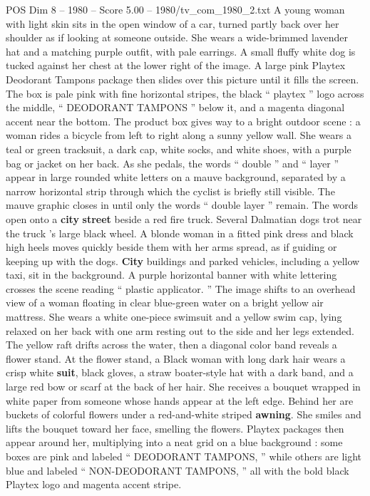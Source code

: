 \begin{textsample}{POS Dim 8 – 1980 – Score 5.00 – 1980/tv\_com\_1980\_2.txt}  \label{ex:f8_pos_050}
A young woman with light skin sits in the open window of a car, turned partly back over her shoulder as if looking at someone outside.
She wears a wide-brimmed lavender hat and a matching purple outfit, with pale earrings.
A small fluffy white dog is tucked against her chest at the lower right of the image.
A large pink Playtex Deodorant Tampons package then slides over this picture until it fills the screen.
The box is pale pink with fine horizontal stripes, the black “ playtex ” logo across the middle, “ DEODORANT TAMPONS ” below it, and a magenta diagonal accent near the bottom.
The product box gives way to a bright outdoor scene : a woman rides a bicycle from left to right along a sunny yellow wall.
She wears a teal or green tracksuit, a dark cap, white socks, and white shoes, with a purple bag or jacket on her back.
As she pedals, the words “ double ” and “ layer ” appear in large rounded white letters on a mauve background, separated by a narrow horizontal strip through which the cyclist is briefly still visible.
The mauve graphic closes in until only the words “ double layer ” remain.
The words open onto a \textbf{city} \textbf{street} beside a red fire truck.
Several Dalmatian dogs trot near the truck ’s large black wheel.
A blonde woman in a fitted pink dress and black high heels moves quickly beside them with her arms spread, as if guiding or keeping up with the dogs. \textbf{City} buildings and parked vehicles, including a yellow taxi, sit in the background.
A purple horizontal banner with white lettering crosses the scene reading “ plastic applicator. ” The image shifts to an overhead view of a woman floating in clear blue-green water on a bright yellow air mattress.
She wears a white one-piece swimsuit and a yellow swim cap, lying relaxed on her back with one arm resting out to the side and her legs extended.
The yellow raft drifts across the water, then a diagonal color band reveals a flower stand.
At the flower stand, a Black woman with long dark hair wears a crisp white \textbf{suit}, black gloves, a straw boater-style hat with a dark band, and a large red bow or scarf at the back of her hair.
She receives a bouquet wrapped in white paper from someone whose hands appear at the left edge.
Behind her are buckets of colorful flowers under a red-and-white striped \textbf{awning}.
She smiles and lifts the bouquet toward her face, smelling the flowers.
Playtex packages then appear around her, multiplying into a neat grid on a blue background : some boxes are pink and labeled “ DEODORANT TAMPONS, ” while others are light blue and labeled “ NON-DEODORANT TAMPONS, ” all with the bold black Playtex logo and magenta accent stripe.

\end{textsample}
